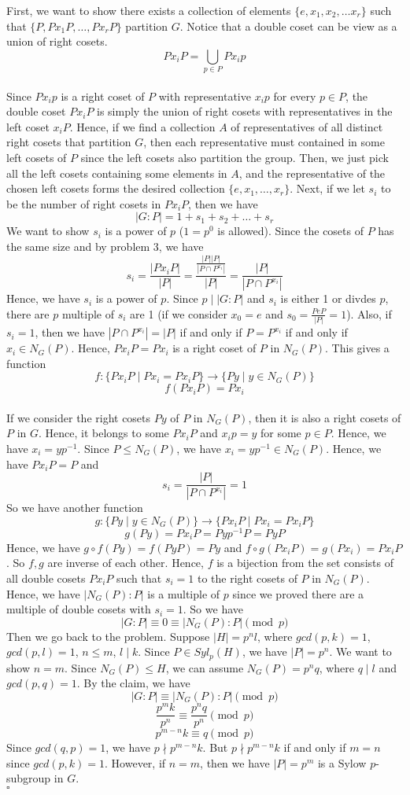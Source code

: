 \documentclass[12pt]{amsart}
\begin{document}
First, we want to show there exists a collection of elements $\{e,x_1,x_2,\dots x_r\}$ such that $\{P,Px_1P,\dots,Px_rP\}$ partition $G$. Notice that a double coset can be view as a union of right cosets.
\[Px_iP=\bigcup_{p\in P}Px_ip\]\\
Since $Px_ip$ is a right coset of $P$ with representative $x_ip$ for every $p\in P$, the double coset $Px_iP$ is simply the union of right cosets with representatives in the left coset $x_iP$. Hence, if we find a collection $A$ of representatives of all distinct right cosets that partition $G$, then each representative must contained in some left cosets of $P$ since the left cosets also partition the group. Then, we just pick all the left cosets containing some elements in $A$, and the representative of the chosen left cosets forms the desired collection $\{e,x_1,\dots, x_r\}$. Next, if we let $s_i$ to be the number of right cosets in $Px_iP$, then we have 
\[|G:P|=1+s_1+s_2+\dots +s_r\]
We want to show $s_i$ is a power of $p$ ($1=p^0$ is allowed). Since the cosets of $P$ has the same size and by problem 3, we have 
\[s_i=\frac{|Px_iP|}{|P|}=\frac{\frac{|P||P|}{|P\cap P^{x_i}|}
}{|P|}=\frac{|P|}{|P\cap P^{x_i}|}\]
Hence, we have $s_i$ is a power of $p$. Since $p\mid |G:P|$ and $s_i$ is either 1 or divdes $p$, there are $p$ multiple of $s_i$ are 1 (if we consider $x_0=e$ and $s_0=\frac{PeP}{|P|}=1$). Also, if $s_i=1$, then we have $|P\cap P^{x_i}|=|P|$ if and only if $P= P^{x_i}$ if and only if $x_i\in N_G(P)$. Hence, $Px_iP=Px_i$ is a right coset of $P$ in $N_G(P)$. This gives a function 
\[f:\{Px_iP\mid Px_i=Px_iP\}\to \{Py\mid y\in N_G(P)\}\]
\[f(Px_iP)=Px_i\]\\
If we consider the right cosets $Py$ of $P$ in $N_G(P)$, then it is also a right cosets of $P$ in $G$. Hence, it belongs to some $Px_iP$ and $x_ip=y$ for some $p\in P$. Hence, we have $x_i=yp^{-1}$. Since $P\leq N_G(P)$, we have $x_i=yp^{-1}\in N_G(P)$. Hence, we have $Px_iP=P$ and 
\[s_i=\frac{|P|}{|P\cap P^{x_i}|}=1\]
So we have another function 
\[g:\{Py\mid y\in N_G(P)\}\to \{Px_iP\mid Px_i=Px_iP\}\]
\[g(Py)=Px_iP=Pyp^{-1}P=PyP\]
Hence, we have $g\circ f(Py)=f(PyP)=Py$ and $f\circ g(Px_iP)=g(Px_i)=Px_iP$. So $f,g$ are inverse of each other. Hence, $f$ is a bijection from the set consists of all double cosets $Px_iP$ such that $s_i=1$ to the right cosets of $P$ in $N_G(P)$. Hence, we have $|N_G(P):P|$ is a multiple of $p$ since we proved there are a multiple of double cosets with $s_i=1$. So we have 
\[|G:P|\equiv 0\equiv |N_G(P):P|\pmod{p}\]
Then we go back to the problem. Suppose $|H|=p^nl$, where $gcd(p,k)=1$, $gcd(p,l)=1$, $n\leq m$, $l\mid k$. Since $P\in Syl_p(H)$, we have $|P|=p^n$. We want to show $n=m$. Since $N_G(P)\leq H$, we can assume $N_G(P)=p^nq$, where $q\mid l$ and $gcd(p,q)=1$. By the claim, we have 
\[|G:P|\equiv |N_G(P):P| \pmod{p}\]
\[\frac{p^mk}{p^n}\equiv \frac{p^nq}{p^n}\pmod{p}\]
\[p^{m-n}k\equiv q\pmod{p}\]
Since $gcd(q,p)=1$, we have $p\nmid p^{m-n}k$. But $p\nmid p^{m-n}k$ if and only if $m=n$ since $gcd(p,k)=1$. However, if $n=m$, then we have $|P|=p^m$ is a Sylow $p$-subgroup in $G$.
\\\phantom{qed}\hfill$\square$\\
\end{document}
